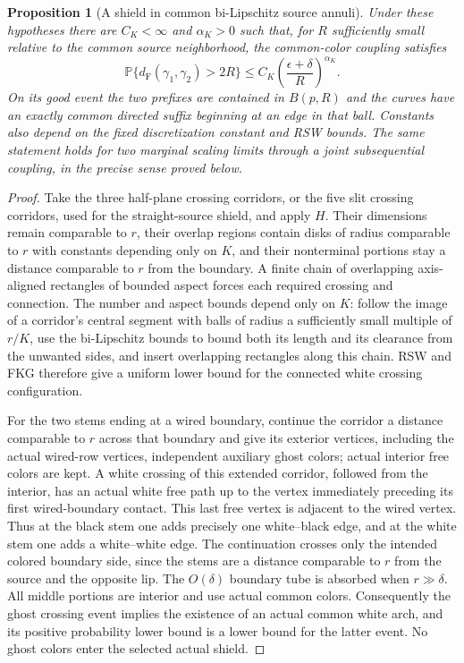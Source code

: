 \documentclass[11pt]{article}
\newtheorem{proposition}[theorem]{Proposition}
\theoremstyle{definition}\newtheorem{definition}[theorem]{Definition}
\theoremstyle{remark}\newtheorem{remark}[theorem]{Remark}
\begin{document}
\begin{proposition}[A shield in common bi-Lipschitz source annuli]
\label{prop:ss-curved}
Under these hypotheses there are $C_K<\infty$ and $\alpha_K>0$ such that,
for $R$ sufficiently small relative to the common source neighborhood,
the common-color coupling satisfies
\[
 \mathbb P\{d_{\mathrm F}(\gamma_1,\gamma_2)>2R\}
 \le C_K\left(\frac{\epsilon+\delta}{R}\right)^{\alpha_K}.
 \tag{SH2}
\]
On its good event the two prefixes are contained in $B(p,R)$ and the
curves have an exactly common directed suffix beginning at an edge in that
ball. Constants also depend on the fixed discretization constant and RSW
bounds. The same statement holds for two marginal scaling limits through
a joint subsequential coupling, in the precise sense proved below.
\end{proposition}
\begin{proof}
Take the three half-plane crossing corridors, or the five slit crossing
corridors, used for the straight-source shield, and apply $H$. Their
dimensions remain comparable to $r$, their overlap regions contain disks
of radius comparable to $r$ with constants depending only on $K$, and
their nonterminal portions stay a distance comparable to $r$ from the
boundary. A finite chain of overlapping axis-aligned rectangles of
bounded aspect forces each required crossing and connection. The number
and aspect bounds depend only on $K$: follow the image of a corridor's
central segment with balls of radius a sufficiently small multiple of
$r/K$, use the bi-Lipschitz bounds to bound both its length and its
clearance from the unwanted sides, and insert overlapping rectangles
along this chain. RSW and FKG therefore give a uniform lower bound for
the connected white crossing configuration.

For the two stems ending at a wired boundary, continue the corridor a
distance comparable to $r$ across that boundary and give its exterior
vertices, including the actual wired-row vertices, independent auxiliary
ghost colors; actual interior free colors are kept. A white crossing of this extended
corridor, followed from the interior, has an actual white free path up
to the vertex immediately preceding its first wired-boundary contact.
This last free vertex is adjacent to the wired vertex. Thus at the black
stem one adds precisely one white--black edge, and at the white stem one
adds a white--white edge. The continuation crosses only the intended
colored boundary side, since the stems are a distance comparable to $r$
from the source and the opposite lip. The $O(\delta)$ boundary tube is
absorbed when $r\gg\delta$. All middle portions are interior and use
actual common colors. Consequently the ghost crossing event implies the
existence of an actual common white arch, and its positive probability
lower bound is a lower bound for the latter event. No ghost colors enter
the selected actual shield.


\end{proof}
\end{document}
